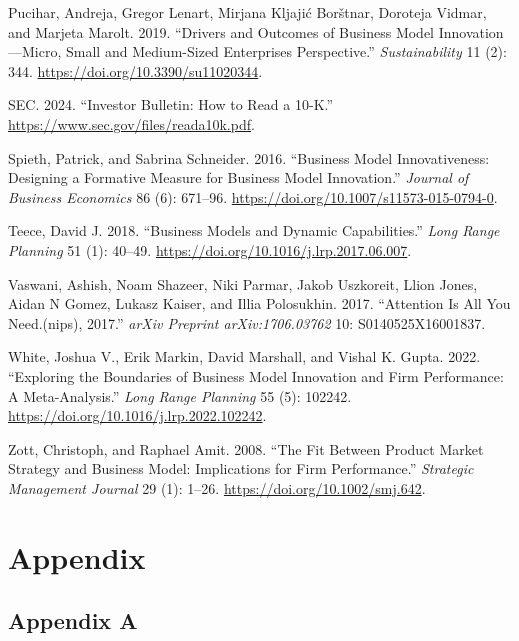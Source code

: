 \documentclass[
]{article}
\newlength{\cslhangindent}
\newenvironment{CSLReferences}[2] %
 {\begin{list}{}{%
  \setlength{\itemindent}{0pt}
  \setlength{\leftmargin}{0pt}
  \setlength{\parsep}{0pt}
  \ifodd #1
   \setlength{\leftmargin}{\cslhangindent}
   \setlength{\itemindent}{-1\cslhangindent}
  \fi
  \setlength{\itemsep}{#2\baselineskip}}}
 {\end{list}}
\begin{document}
\begin{CSLReferences}{1}{0}
Pucihar, Andreja, Gregor Lenart, Mirjana Kljajić Borštnar, Doroteja
Vidmar, and Marjeta Marolt. 2019. {``Drivers and {Outcomes} of
{Business} {Model} {Innovation}---{Micro}, {Small} and {Medium}-{Sized}
{Enterprises} {Perspective}.''} \emph{Sustainability} 11 (2): 344.
\url{https://doi.org/10.3390/su11020344}.

SEC. 2024. {``Investor {Bulletin}: {How} to {Read} a 10-{K}.''}
\url{https://www.sec.gov/files/reada10k.pdf}.

Spieth, Patrick, and Sabrina Schneider. 2016. {``Business Model
Innovativeness: Designing a Formative Measure for Business Model
Innovation.''} \emph{Journal of Business Economics} 86 (6): 671--96.
\url{https://doi.org/10.1007/s11573-015-0794-0}.

Teece, David J. 2018. {``Business Models and Dynamic Capabilities.''}
\emph{Long Range Planning} 51 (1): 40--49.
\url{https://doi.org/10.1016/j.lrp.2017.06.007}.

Vaswani, Ashish, Noam Shazeer, Niki Parmar, Jakob Uszkoreit, Llion
Jones, Aidan N Gomez, Lukasz Kaiser, and Illia Polosukhin. 2017.
{``Attention Is All You Need.(nips), 2017.''} \emph{arXiv Preprint
arXiv:1706.03762} 10: S0140525X16001837.

White, Joshua V., Erik Markin, David Marshall, and Vishal K. Gupta.
2022. {``Exploring the Boundaries of Business Model Innovation and Firm
Performance: {A} Meta-Analysis.''} \emph{Long Range Planning} 55 (5):
102242. \url{https://doi.org/10.1016/j.lrp.2022.102242}.

Zott, Christoph, and Raphael Amit. 2008. {``The Fit Between Product
Market Strategy and Business Model: Implications for Firm
Performance.''} \emph{Strategic Management Journal} 29 (1): 1--26.
\url{https://doi.org/10.1002/smj.642}.

\end{CSLReferences}

\newpage{}

\section{Appendix}\label{appendix}

\subsection{Appendix A}\label{appendix-a}
\end{document}
